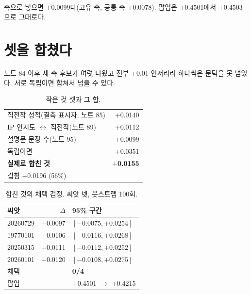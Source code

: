 \documentclass[10pt]{article}
\begin{document}

축으로 넣으면 $+$0.0099다(고유 축, 공통 축 $+$0.0078). 팝업은 $+$0.4501에서
$+$0.4503으로 그대로다.

\section{셋을 합쳤다}

노트 84 이후 새 축 후보가 여럿 나왔고 전부 $+$0.01 언저리라 하나씩은 문턱을
못 넘었다. 서로 독립이면 합쳐서 넘을 수 있다.

\begin{table}[t]
\centering\tsize
\caption{작은 것 셋과 그 합.}
\begin{tabular}{lr}
\toprule
직전작 성적(결측 표시자, 노트 85) & $+$0.0140 \\
IP 인지도 $\leftrightarrow$ 직전작(노트 89) & $+$0.0112 \\
설명문 문장 수(노트 95) & $+$0.0099 \\
\midrule
독립이면 & $+$0.0351 \\
\textbf{실제로 합친 것} & \textbf{$+$0.0155} \\
\midrule
\multicolumn{2}{l}{겹침 $-$0.0196 (56\%)} \\
\bottomrule
\end{tabular}
\end{table}

\begin{table}[t]
\centering\tsize
\caption{합친 것의 채택 검정. 씨앗 넷, 붓스트랩 100회.}
\begin{tabular}{lrl}
\toprule
씨앗 & $\Delta$ & 95\% 구간 \\
\midrule
20260729 & $+$0.0097 & $[-0.0075, +0.0254]$ \\
19770101 & $+$0.0106 & $[-0.0116, +0.0268]$ \\
20250315 & $+$0.0111 & $[-0.0112, +0.0252]$ \\
20260101 & $+$0.0120 & $[-0.0108, +0.0275]$ \\
\midrule
\multicolumn{2}{l}{채택} & \textbf{0/4} \\
\multicolumn{2}{l}{팝업} & $+$0.4501 $\to$ $+$0.4215 \\
\bottomrule
\end{tabular}
\end{table}
\end{document}
